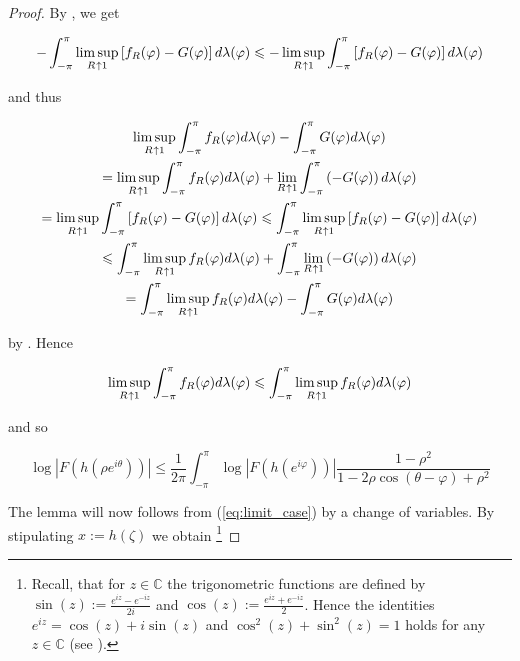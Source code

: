 \begin{proof}
By \cite[354]{bourbaki:general_topology:1995}, we get

\begin{equation*}
	-\int_{-\pi}^\pi \limsup_{R \toup 1}\left[ f_R(\varphi) - G(\varphi)\right]d\lambda(\varphi) \leqslant -\limsup_{R \toup 1} \int_{-\pi}^\pi \left[ f_R(\varphi) - G(\varphi)\right]d\lambda(\varphi)
\end{equation*}

and thus

\begin{multline*}
	\limsup_{R \toup 1} \int_{-\pi}^\pi f_R(\varphi) d\lambda(\varphi) - \int_{-\pi}^\pi G(\varphi)d\lambda(\varphi)\\
	= \limsup_{R \toup 1} \int_{-\pi}^\pi f_R(\varphi) d\lambda(\varphi) + \lim_{R \toup 1}\int_{-\pi}^\pi \left(-G(\varphi)\right)d\lambda(\varphi)\\
	= \limsup_{R \toup 1}\int_{-\pi}^\pi \left[ f_R(\varphi) - G(\varphi)\right]d\lambda(\varphi)\leqslant \int_{-\pi}^\pi \limsup_{R \toup 1} \left[f_R(\varphi) - G(\varphi)\right]d\lambda(\varphi)\\
	\leqslant \int_{-\pi}^\pi \limsup_{R \toup 1} f_R(\varphi) d\lambda(\varphi) + \int_{-\pi}^\pi\lim_{R \toup 1} \left(-G(\varphi)\right)d\lambda(\varphi)\\
	= \int_{-\pi}^\pi \limsup_{R \toup 1}f_R(\varphi) d\lambda(\varphi) - \int_{-\pi}^\pi G(\varphi)d\lambda(\varphi)
\end{multline*}

by \cite[358]{bourbaki:general_topology:1995}. Hence

\begin{equation*}
	\limsup_{R \toup 1} \int_{-\pi}^\pi f_R(\varphi) d\lambda(\varphi) \leqslant\int_{-\pi}^\pi \limsup_{R \toup 1}f_R(\varphi) d\lambda(\varphi)
\end{equation*}

and so 

\begin{equation}
	\log\left| F( h( \rho e^{i\theta} ) )\right| \leqslant \frac{1}{2\pi} \int_{-\pi}^\pi \log\left| F( h( e^{i\varphi}))\right| \frac{1 - \rho^2}{1 - 2\rho\cos\left( \theta - \varphi \right) + \rho^2}	
	\label{eq:limit_case}
\end{equation}

The lemma will now follows from (\ref{eq:limit_case}) by a change of variables. By stipulating $x := h\left( \zeta \right)$ we obtain \footnote{
		Recall, that for $z \in \mathbb{C}$ the trigonometric functions are defined by $\sin(z) := \frac{e^{iz} - e^{-iz}}{2i}$ and $\cos(z) := \frac{e^{iz} + e^{-iz}}{2}$. Hence the identities $e^{iz} = \cos(z) + i\sin(z)$ and $\cos^2(z) + \sin^2(z) = 1$ holds for any $z \in \mathbb{C}$ (see \cite[42--44]{ahlfors:complex_analysis:1979}).	
	}


\end{proof}
